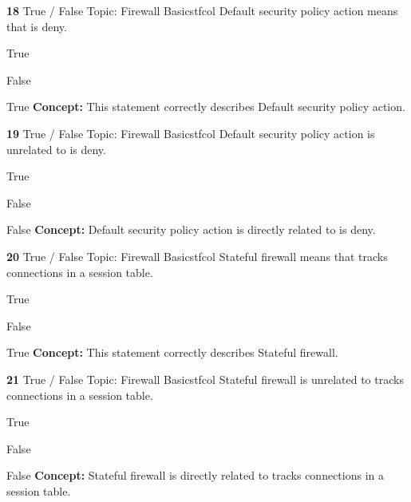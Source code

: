 \documentclass[10pt,a4paper]{article}
\begin{document}
\begin{qcard}{\color{white}\textbf{18} \hfill \small True / False \textbar{} Topic: Firewall Basics}{tfcol}
Default security policy action means that is deny.

\begin{qoptions}
\item True
\item False
\end{qoptions}
\begin{explainbox}{True}
\textbf{Concept:} This statement correctly describes Default security policy action.
\end{explainbox}
\end{qcard}

\begin{qcard}{\color{white}\textbf{19} \hfill \small True / False \textbar{} Topic: Firewall Basics}{tfcol}
Default security policy action is unrelated to is deny.

\begin{qoptions}
\item True
\item False
\end{qoptions}
\begin{explainbox}{False}
\textbf{Concept:} Default security policy action is directly related to is deny.
\end{explainbox}
\end{qcard}

\begin{qcard}{\color{white}\textbf{20} \hfill \small True / False \textbar{} Topic: Firewall Basics}{tfcol}
Stateful firewall means that tracks connections in a session table.

\begin{qoptions}
\item True
\item False
\end{qoptions}
\begin{explainbox}{True}
\textbf{Concept:} This statement correctly describes Stateful firewall.
\end{explainbox}
\end{qcard}

\begin{qcard}{\color{white}\textbf{21} \hfill \small True / False \textbar{} Topic: Firewall Basics}{tfcol}
Stateful firewall is unrelated to tracks connections in a session table.

\begin{qoptions}
\item True
\item False
\end{qoptions}
\begin{explainbox}{False}
\textbf{Concept:} Stateful firewall is directly related to tracks connections in a session table.
\end{explainbox}
\end{qcard}
\end{document}
